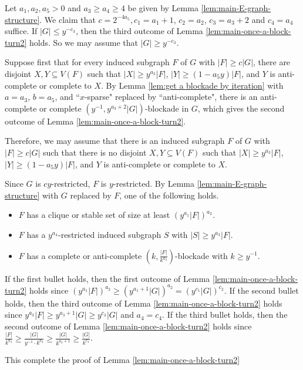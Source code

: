 \documentclass[a4paper,11pt]{article}
\let\oldendproof\endproof
\renewenvironment{proof}[1][\proofname]{%
	\oldproof[\normalfont\bfseries #1]%
}{\oldendproof}
\begin{document}
    \begin{proof}
        Let $a_1,a_2,a_5>0$ and $a_3\geq a_4\geq 4$ be given by Lemma \ref{lem:main-E-graph-structure}. 
        We claim that $c=2^{-4a_5},c_1=a_1+1$, $c_2=a_2$, $c_3=a_3+2$ and $c_4=a_4$ suffice.
        If $|G|\leq y^{-c_3}$, then the third outcome of Lemma \ref{lem:main-once-a-block-turn2} holds. 
        So we may assume that $|G|\geq y^{-c_3}$. 
        
        Suppose  first that for every induced subgraph $F$ of $G$ with $|F|\geq c|G|$, there are disjoint $X,Y\subseteq V(F)$ such that $|X|\geq y^{a_3}|F|$, $|Y|\geq (1-a_5y)|F|$, and $Y$ is anti-complete or complete to $X$.
        By Lemma \ref{lem:get a blockade by iteration} with $a=a_3$, $b=a_5$, and ``$x$-sparse" replaced by ``anti-complete", there is an anti-complete or complete $(y^{-1},y^{a_3+2}|G|)$-blockade in $G$, which gives the second outcome of Lemma \ref{lem:main-once-a-block-turn2}.
        
        Therefore, we may assume that there is an induced subgraph $F$ of $G$ with $|F|\geq c|G|$ such that there is no disjoint $X,Y\subseteq V(F)$ such that $|X|\geq y^{a_3}|F|$, $|Y|\geq (1-a_5y)|F|$, and $Y$ is anti-complete or complete to $X$.
        
        Since $G$ is $cy$-restricted, $F$ is $y$-restricted. 
        By Lemma \ref{lem:main-E-graph-structure} with $G$ replaced by $F$, one of the following holds. 
        \begin{itemize}
            \item $F$ has a clique or stable set of size at least $(y^{a_1}|F|)^{a_2}$.


            \item $F$ has a $y^{a_4}$-restricted induced subgraph $S$ with $|S|\geq y^{a_3}|F|$.

            \item $F$ has a complete or anti-complete $(k,\frac{|F|}{k^{a_3}})$-blockade with $k\geq y^{-1}$. 
        \end{itemize}
        
        If the first bullet holds, then the first outcome of Lemma \ref{lem:main-once-a-block-turn2} holds since $(y^{a_1}|F|)^{a_2}\geq (y^{a_1+1}|G|)^{a_2}=(y^{c_1}|G|)^{c_2}$. 
        If the second bullet holds, then the third outcome of Lemma \ref{lem:main-once-a-block-turn2} holds since $y^{a_3}|F|\geq y^{a_3+1}|G|\geq y^{c_3}|G|$ and $a_4=c_4$. 
        If the third bullet holds, then the second outcome of Lemma \ref{lem:main-once-a-block-turn2} holds since $\frac{|F|}{k^{a_3}}\geq \frac{|G|}{y^{-1}\cdot k^{a_3}}\geq \frac{|G|}{k^{a_3+1}}\geq \frac{|G|}{k^{c_3}}$.
        
        This complete the proof of Lemma \ref{lem:main-once-a-block-turn2}
    \end{proof}
\end{document}
